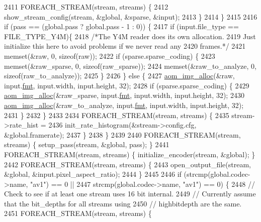 \begin{DoxyCodeInclude}
{{{{{{{{{{{{{{{{{{{{{{{{{{{{{{{{{{{{{{{{{{{{{{{{{{{{{{{{{{{{{{{{{2411       FOREACH\_STREAM(stream, streams) \{
2412         show\_stream\_config(stream, &global, &sparse, &input);
2413       \}
2414     \}
2415 
2416     \textcolor{keywordflow}{if} (pass == (global.pass ? global.pass - 1 : 0)) \{
2417       \textcolor{keywordflow}{if} (input.file\_type == FILE\_TYPE\_Y4M)\{
2418         \textcolor{comment}{/*The Y4M reader does its own allocation.}
2419 \textcolor{comment}{          Just initialize this here to avoid problems if we never read any}
2420 \textcolor{comment}{          frames.*/}
2421         memset(&raw, 0, \textcolor{keyword}{sizeof}(raw));
2422         \textcolor{keywordflow}{if} (sparse.sparse\_coding) \{
2423           memset(&raw\_sparse, 0, \textcolor{keyword}{sizeof}(raw\_sparse));
2424           memset(&raw\_to\_analyze, 0, \textcolor{keyword}{sizeof}(raw\_to\_analyze));
2425         \}
2426       \} \textcolor{keywordflow}{else} \{
2427         \hyperlink{aom__image_8h_a570db29fbd122951235a08fe9375f6bb}{aom\_img\_alloc}(&raw, input.\hyperlink{structaom__image_a6c64b1ab918d80d52eb8f5d6d957e825}{fmt}, input.width, input.height, 32);
2428         \textcolor{keywordflow}{if} (sparse.sparse\_coding) \{
2429           \hyperlink{aom__image_8h_a570db29fbd122951235a08fe9375f6bb}{aom\_img\_alloc}(&raw\_sparse, input.\hyperlink{structaom__image_a6c64b1ab918d80d52eb8f5d6d957e825}{fmt}, input.width, input.height, 32);
2430           \hyperlink{aom__image_8h_a570db29fbd122951235a08fe9375f6bb}{aom\_img\_alloc}(&raw\_to\_analyze, input.\hyperlink{structaom__image_a6c64b1ab918d80d52eb8f5d6d957e825}{fmt}, input.width, input.height, 32);
2431         \}
2432       \}
2433 
2434       FOREACH\_STREAM(stream, streams) \{
2435         stream->rate\_hist =
2436             init\_rate\_histogram(&stream->config.cfg, &global.framerate);
2437       \}
2438     \}
2439 
2440     FOREACH\_STREAM(stream, streams) \{ setup\_pass(stream, &global, pass); \}
2441     FOREACH\_STREAM(stream, streams) \{ initialize\_encoder(stream, &global); \}
2442     FOREACH\_STREAM(stream, streams) \{
2443       open\_output\_file(stream, &global, &input.pixel\_aspect\_ratio);
2444     \}
2445 
2446     \textcolor{keywordflow}{if} (strcmp(global.codec->name, \textcolor{stringliteral}{"av1"}) == 0 ||
2447         strcmp(global.codec->name, \textcolor{stringliteral}{"av1"}) == 0) \{
2448       \textcolor{comment}{// Check to see if at least one stream uses 16 bit internal.}
2449       \textcolor{comment}{// Currently assume that the bit\_depths for all streams using}
2450       \textcolor{comment}{// highbitdepth are the same.}
2451       FOREACH\_STREAM(stream, streams) \{
}}}}}}}}}}}}}}}}}}}}}}}}}}}}}}}}}}}}}}}}}}}}}}}}}}}}}}}}}}}}}}}}}
\end{DoxyCodeInclude}
